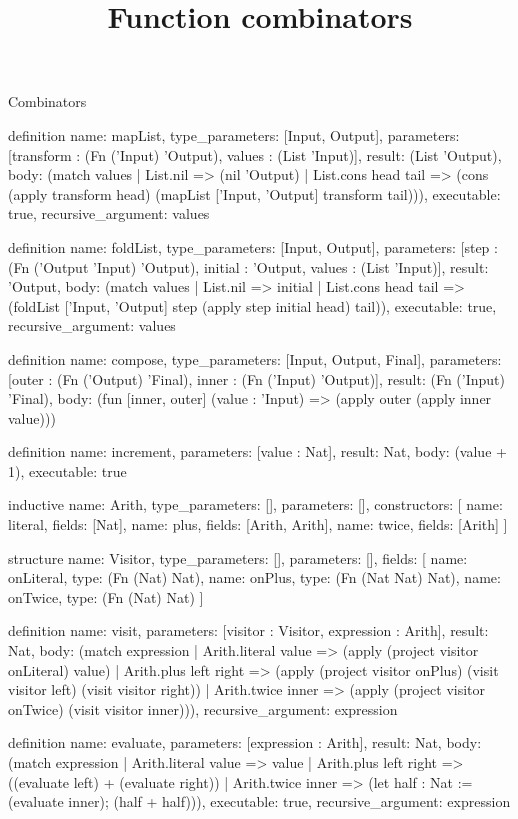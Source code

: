 \begin{lexlean}{Combinators}
\title{Function combinators}
\begin{semanticmodule}
definition{
  name: mapList,
  type_parameters: [Input, Output],
  parameters: [transform : (Fn ('Input) 'Output), values : (List 'Input)],
  result: (List 'Output),
  body: (match values
    | List.nil => (nil 'Output)
    | List.cons head tail => (cons (apply transform head) (mapList ['Input, 'Output] transform tail))),
  executable: true,
  recursive_argument: values
}

definition{
  name: foldList,
  type_parameters: [Input, Output],
  parameters: [step : (Fn ('Output 'Input) 'Output), initial : 'Output, values : (List 'Input)],
  result: 'Output,
  body: (match values
    | List.nil => initial
    | List.cons head tail => (foldList ['Input, 'Output] step (apply step initial head) tail)),
  executable: true,
  recursive_argument: values
}

definition{
  name: compose,
  type_parameters: [Input, Output, Final],
  parameters: [outer : (Fn ('Output) 'Final), inner : (Fn ('Input) 'Output)],
  result: (Fn ('Input) 'Final),
  body: (fun [inner, outer] (value : 'Input) => (apply outer (apply inner value)))
}

definition{
  name: increment,
  parameters: [value : Nat],
  result: Nat,
  body: (value + 1),
  executable: true
}

inductive{
  name: Arith,
  type_parameters: [],
  parameters: [],
  constructors: [
    {name: literal, fields: [Nat]},
    {name: plus, fields: [Arith, Arith]},
    {name: twice, fields: [Arith]}
  ]
}

structure{
  name: Visitor,
  type_parameters: [],
  parameters: [],
  fields: [
    {name: onLiteral, type: (Fn (Nat) Nat)},
    {name: onPlus, type: (Fn (Nat Nat) Nat)},
    {name: onTwice, type: (Fn (Nat) Nat)}
  ]
}

definition{
  name: visit,
  parameters: [visitor : Visitor, expression : Arith],
  result: Nat,
  body: (match expression
    | Arith.literal value => (apply (project visitor onLiteral) value)
    | Arith.plus left right => (apply (project visitor onPlus) (visit visitor left) (visit visitor right))
    | Arith.twice inner => (apply (project visitor onTwice) (visit visitor inner))),
  recursive_argument: expression
}

definition{
  name: evaluate,
  parameters: [expression : Arith],
  result: Nat,
  body: (match expression
    | Arith.literal value => value
    | Arith.plus left right => ((evaluate left) + (evaluate right))
    | Arith.twice inner => (let half : Nat := (evaluate inner); (half + half))),
  executable: true,
  recursive_argument: expression
}
\end{semanticmodule}
\end{lexlean}
